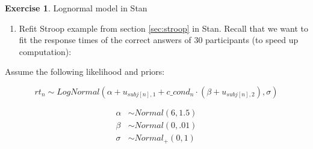 \documentclass[12pt,]{krantz}
\newenvironment{Shaded}{\begin{snugshade}}{\end{snugshade}}
\newcommand{\CommentTok}[1]{\textcolor[rgb]{0.56,0.35,0.01}{\textit{#1}}}
\newcommand{\DataTypeTok}[1]{\textcolor[rgb]{0.13,0.29,0.53}{#1}}
\newcommand{\DecValTok}[1]{\textcolor[rgb]{0.00,0.00,0.81}{#1}}
\newcommand{\KeywordTok}[1]{\textcolor[rgb]{0.13,0.29,0.53}{\textbf{#1}}}
\newcommand{\NormalTok}[1]{#1}
\newcommand{\OperatorTok}[1]{\textcolor[rgb]{0.81,0.36,0.00}{\textbf{#1}}}
\newcommand{\StringTok}[1]{\textcolor[rgb]{0.31,0.60,0.02}{#1}}
\providecommand{\tightlist}{%
  \setlength{\itemsep}{0pt}\setlength{\parskip}{0pt}}
\theoremstyle{definition}
\theoremstyle{definition}
\theoremstyle{definition}
\newtheorem{exercise}{Exercise}[chapter]
\theoremstyle{remark}
\begin{document}
\begin{exercise}
\protect\hypertarget{exr:stroop}{}{\label{exr:stroop} }Lognormal model in Stan
\end{exercise}

\begin{enumerate}
\def\labelenumi{\alph{enumi}.}
\tightlist
\item
  Refit Stroop example from section \ref{sec:stroop} in Stan. Recall that we want to fit the response times of the correct answers of 30 participants (to speed up computation):
\end{enumerate}

\begin{Shaded}
\end{Shaded}

Assume the following likelihood and priors:

\begin{equation}
  rt_n \sim LogNormal(\alpha + u_{subj[n],1}  + c\_cond_n \cdot  (\beta + u_{subj[n],2}), \sigma)
\end{equation}

\begin{equation}
 \begin{aligned}
   \alpha & \sim Normal(6, 1.5) \\
   \beta  & \sim Normal(0, .01) \\
    \sigma  &\sim Normal_+(0, 1)
 \end{aligned}
 \end{equation}
\end{document}
